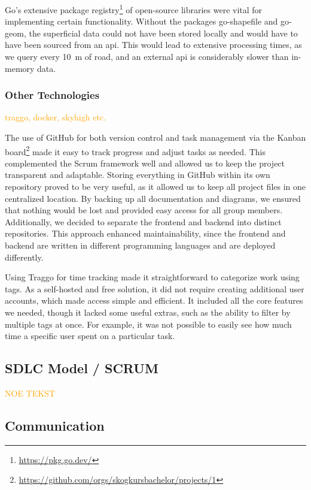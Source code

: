 Go's extensive package registry\footnote{\url{https://pkg.go.dev/}} of open-source libraries were vital for implementing certain functionality. Without the packages go-shapefile and go-geom, the superficial data could not have been stored locally and would have to have been sourced from an \acrshort{api}. This would lead to extensive processing times, as we query every \qty{10}{\meter} of road, and an external \acrshort{api} is considerably slower than in-memory data.

\subsubsection{Other Technologies}

\textcolor{orange}{traggo, docker, skyhigh etc.}

The use of GitHub for both version control and task management via the Kanban board\footnote{\url{https://github.com/orgs/skogkursbachelor/projects/1}} made it easy to track progress and adjust tasks as needed. This complemented the Scrum framework well and allowed us to keep the project transparent and adaptable. Storing everything in GitHub within its own repository proved to be very useful, as it allowed us to keep all project files in one centralized location. By backing up all documentation and diagrams, we ensured that nothing would be lost and provided easy access for all group members. Additionally, we decided to separate the frontend and backend into distinct repositories. This approach enhanced maintainability, since the frontend and backend are written in different programming languages and are deployed differently.

Using Traggo for time tracking made it straightforward to categorize work using tags. As a self-hosted and free solution, it did not require creating additional user accounts, which made access simple and efficient. It included all the core features we needed, though it lacked some useful extras, such as the ability to filter by multiple tags at once. For example, it was not possible to easily see how much time a specific user spent on a particular task.

\subsection{SDLC Model / SCRUM}

\textcolor{orange}{NOE TEKST}

\subsection{Communication}

